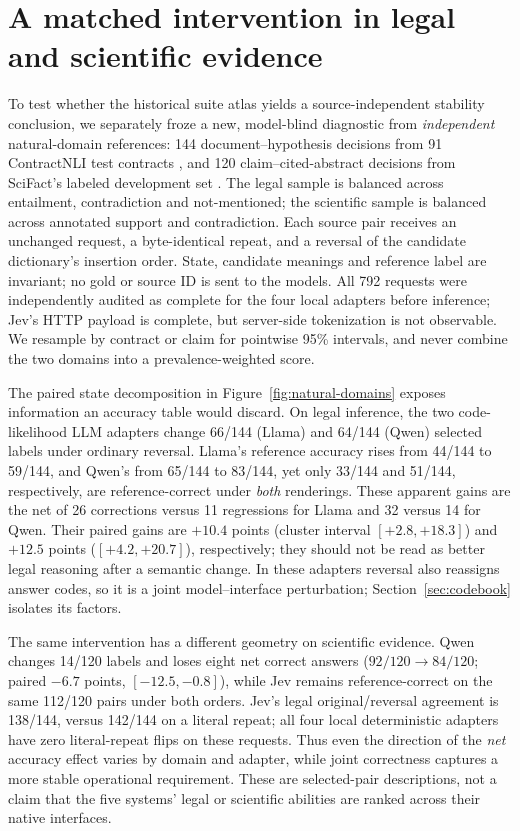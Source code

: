 \section{A matched intervention in legal and scientific evidence}
\label{sec:natural-domains}
To test whether the historical suite atlas yields a source-independent stability conclusion, we separately froze a new, model-blind diagnostic from \emph{independent} natural-domain references: 144 document--hypothesis decisions from 91 ContractNLI test contracts \citep{contractnli}, and 120 claim--cited-abstract decisions from SciFact's labeled development set \citep{scifact}. The legal sample is balanced across entailment, contradiction and not-mentioned; the scientific sample is balanced across annotated support and contradiction. Each source pair receives an unchanged request, a byte-identical repeat, and a reversal of the candidate dictionary's insertion order. State, candidate meanings and reference label are invariant; no gold or source ID is sent to the models. All 792 requests were independently audited as complete for the four local adapters before inference; Jev's HTTP payload is complete, but server-side tokenization is not observable. We resample by contract or claim for pointwise 95\% intervals, and never combine the two domains into a prevalence-weighted score.

The paired state decomposition in Figure~\ref{fig:natural-domains} exposes information an accuracy table would discard. On legal inference, the two code-likelihood LLM adapters change 66/144 (Llama) and 64/144 (Qwen) selected labels under ordinary reversal. Llama's reference accuracy rises from 44/144 to 59/144, and Qwen's from 65/144 to 83/144, yet only 33/144 and 51/144, respectively, are reference-correct under \emph{both} renderings. These apparent gains are the net of 26 corrections versus 11 regressions for Llama and 32 versus 14 for Qwen. Their paired gains are $+10.4$ points (cluster interval $[+2.8,+18.3]$) and $+12.5$ points ($[+4.2,+20.7]$), respectively; they should not be read as better legal reasoning after a semantic change. In these adapters reversal also reassigns answer codes, so it is a joint model--interface perturbation; Section~\ref{sec:codebook} isolates its factors.

The same intervention has a different geometry on scientific evidence. Qwen changes 14/120 labels and loses eight net correct answers ($92/120\to84/120$; paired $-6.7$ points, $[-12.5,-0.8]$), while Jev remains reference-correct on the same 112/120 pairs under both orders. Jev's legal original/reversal agreement is 138/144, versus 142/144 on a literal repeat; all four local deterministic adapters have zero literal-repeat flips on these requests. Thus even the direction of the \emph{net} accuracy effect varies by domain and adapter, while joint correctness captures a more stable operational requirement. These are selected-pair descriptions, not a claim that the five systems' legal or scientific abilities are ranked across their native interfaces.

